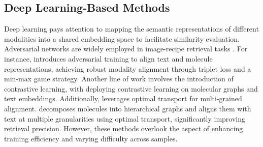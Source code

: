 \subsection{Deep Learning-Based Methods}
Deep learning pays attention to mapping the semantic representations of different modalities into a shared embedding space to facilitate similarity evaluation. Adversarial networks are widely employed in image-recipe retrieval tasks \cite{wang2019learning, li2021multi}. For instance, \citet{10063974} introduces adversarial training to align text and molecule representations, achieving robust modality alignment through triplet loss and a min-max game strategy. Another line of work involves the introduction of contrastive learning, with \citet{su2022molecularmultimodalfoundationmodel} deploying contrastive learning on molecular graphs and text embeddings. Additionally, \citet{10822800} leverages optimal transport for multi-grained alignment. \citet{10821722} decomposes molecules into hierarchical graphs and aligns them with text at multiple granularities using optimal transport, significantly improving retrieval precision. However, these methods overlook the aspect of enhancing training efficiency and varying difficulty across samples.